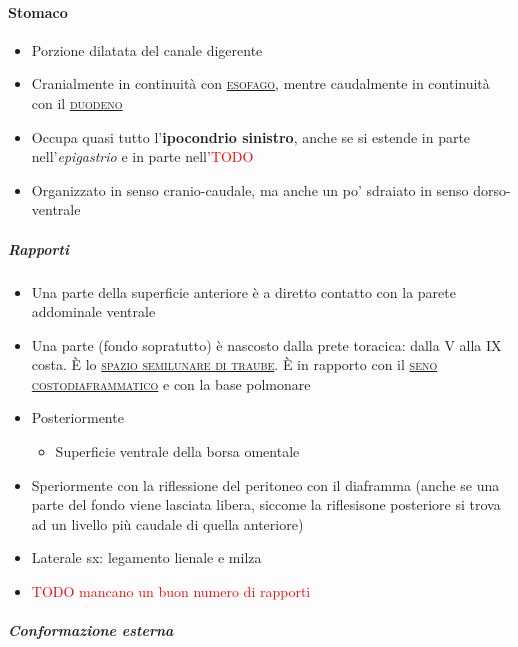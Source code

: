\documentclass[italian,]{article}
\providecommand{\tightlist}{%
  \setlength{\itemsep}{0pt}\setlength{\parskip}{0pt}}
\renewcommand{\a}[1]{\underline{\textsc{#1}}}
\newcommand{\TODO}[1]{\textcolor{red}{\textsf{\footnotesize{TODO #1}}}} %
\begin{document}
\hypertarget{stomaco}{%
\paragraph{Stomaco}\label{stomaco}}

\begin{itemize}
\tightlist
\item
  Porzione dilatata del canale digerente
\item
  Cranialmente in continuità con \a{esofago}, mentre caudalmente in
  continuità con il \a{duodeno}
\item
  Occupa quasi tutto l'\textbf{ipocondrio sinistro}, anche se si estende
  in parte nell'\emph{epigastrio} e in parte nell'\TODO{}
\item
  Organizzato in senso cranio-caudale, ma anche un po' sdraiato in senso
  dorso-ventrale
\end{itemize}

\hypertarget{rapporti-1}{%
\subparagraph{Rapporti}\label{rapporti-1}}

\begin{itemize}
\item
  Una parte della superficie anteriore è a diretto contatto con la
  parete addominale ventrale
\item
  Una parte (fondo sopratutto) è nascosto dalla prete toracica: dalla V
  alla IX costa. È lo \a{spazio semilunare di traube}. È in rapporto con
  il \a{seno costodiaframmatico} e con la base polmonare
\item
  Posteriormente

  \begin{itemize}
  \tightlist
  \item
    Superficie ventrale della borsa omentale
  \end{itemize}
\item
  Speriormente con la riflessione del peritoneo con il diaframma (anche
  se una parte del fondo viene lasciata libera, siccome la riflesisone
  posteriore si trova ad un livello più caudale di quella anteriore)
\item
  Laterale sx: legamento lienale e milza
\item
  \TODO{mancano un buon numero di rapporti}
\end{itemize}

\hypertarget{conformazione-esterna}{%
\subparagraph{Conformazione esterna}\label{conformazione-esterna}}
\end{document}
